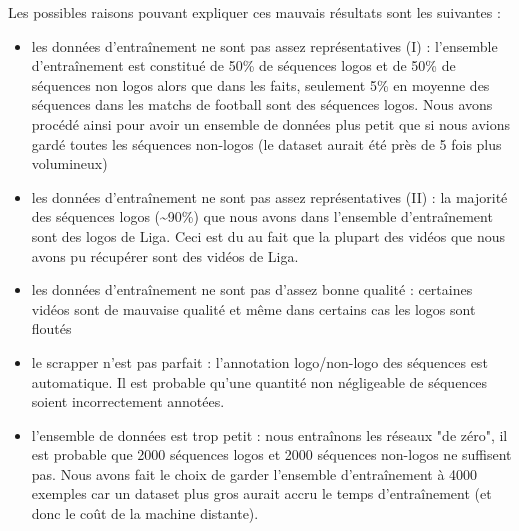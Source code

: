 \documentclass[11pt]{article}
\begin{document}
Les possibles raisons pouvant expliquer ces mauvais résultats sont les suivantes :\\
\begin{itemize}
\item les données d'entraînement ne sont pas assez représentatives (I) : l'ensemble d'entraînement est constitué de 50\% de séquences logos et de 50\% de séquences non logos alors que dans les faits, seulement 5\% en moyenne des séquences dans les matchs de football sont des séquences logos. Nous avons procédé ainsi pour avoir un ensemble de données plus petit que si nous avions gardé toutes les séquences non-logos (le dataset aurait été près de 5 fois plus volumineux)\\
\item les données d'entraînement ne sont pas assez représentatives (II) : la majorité des séquences logos (\textasciitilde{}90\%) que nous avons dans l'ensemble d'entraînement sont des logos de Liga. Ceci est du au fait que la plupart des vidéos que nous avons pu récupérer sont des vidéos de Liga.\\
\item les données d'entraînement ne sont pas d'assez bonne qualité : certaines vidéos sont de mauvaise qualité et même dans certains cas les logos sont floutés\\
\item le scrapper n'est pas parfait : l'annotation logo/non-logo des séquences est automatique. Il est probable qu'une quantité non négligeable de séquences soient incorrectement annotées.\\
\item l'ensemble de données est trop petit : nous entraînons les réseaux "de zéro", il est probable que 2000 séquences logos et 2000 séquences non-logos ne suffisent pas. Nous avons fait le choix de garder l'ensemble d'entraînement à 4000 exemples car un dataset plus gros aurait accru le temps d'entraînement (et donc le coût de la machine distante).\\
\end{itemize}

\newpage
\end{document}
